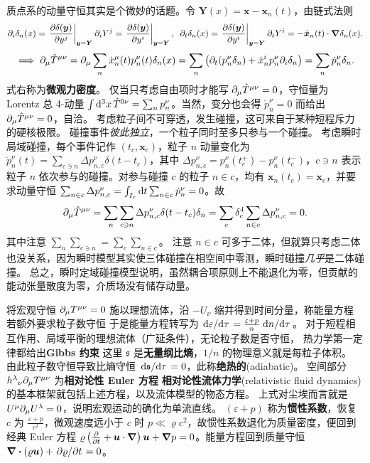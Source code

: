 质点系的动量守恒其实是个微妙的话题。令 $\bm Y(x) = \bm x-\bm x_n(t)$，由链式法则
\[
    \p_i\delta_n(x) = \eval{\pdv{\delta(\bm y)}{y^j}}_{\bm y = \bm Y} \p_i Y^j = \eval{\pdv{\delta(\bm y)}{y^i}}_{\bm y = \bm Y},\enskip\p_t\delta_n(x) = \eval{\pdv{\delta(\bm y)}{y^i}}_{\bm y = \bm Y} \p_t Y^i = -\dot{\bm x}_n(t)\cdot\grad\delta_n(x).
\]
\[\implies\partial_\mu \hat T^{\mu\nu} = \partial_\mu \sum_n \dot x^\mu_n(t) p^\nu_n(t) \delta_n(x)= \sum_n \left(\partial_t(p^\nu_n \delta_n) + \dot x^i_n p^\nu_n \partial_i\delta_n\right) = \sum_n \dot p^\nu_n \delta_n.\]
式右称为\textbf{微观力密度}。
仅当只考虑自由项时才能写 $\partial_\mu \hat T^{\mu\nu}=0$，守恒量为 Lorentz 总 4-动量 $\int\dd[3]{x} \hat T^{0\nu} = \sum_n p^\nu_n$。当然，变分也会得 $\dot p^\nu_n=0$ 而给出 $\partial_\mu \hat T^{\mu\nu}=0$，自洽。
考虑粒子间不可穿透，发生碰撞，这可来自于某种短程斥力的硬核极限。
碰撞事件\textit{彼此独立}，一个粒子同时至多只参与一个碰撞。
考虑瞬时局域碰撞，每个事件记作 $(t_c,\bm x_c)$，粒子 $n$ 动量变化为 $\dot p^\nu_n(t) = \sum_{c\ni n}\Delta p_{n,c}^\nu \delta(t-t_c)$，其中 $\Delta p_{n,c}^\nu=p_n^\nu(t_c^+) - p_n^\nu(t_c^-)$，$c\ni n$ 表示粒子 $n$ 依次参与的碰撞。对参与碰撞 $c$ 的粒子 $n\in c$，均有 $\bm x_n(t_c)=\bm x_c$，并要求动量守恒 $\sum_{n\in c} \Delta p_{n,c}^\nu = \int_{I_c}\dd t \sum_{n\in c}\dot p^\nu_n = 0$。故
\[
    \partial_\mu \hat T^{\mu\nu} = \sum_n\sum_{c\ni n} \Delta p_{n,c}^\nu \delta(t-t_c)\delta_n = \sum_c \delta^4_c\sum_{n\in c} \Delta p_{n,c}^\nu = 0.
\]
其中注意 $\sum_n\sum_{c\ni n}=\sum_c\sum_{n\in c}$。
注意 $n\in c$ 可多于二体，但就算只考虑二体也没关系，因为瞬时模型其实使三体碰撞在相空间中零测，瞬时碰撞\textit{几乎}是二体碰撞。
总之，瞬时定域碰撞模型说明，虽然耦合项原则上不能退化为零，但贡献的能动张量散度为零，介质场没有储存动量。

将宏观守恒 $\partial_\mu T^{\mu\nu} = 0$ 施以理想流体，沿 $-U_\nu$ 缩并得到时间分量，称能量方程
若额外要求粒子数守恒
于是能量方程转写为 $\dv*{\varepsilon}{\tau} = \frac{\varepsilon+p}{n}\dv*{n}{\tau}$。
对于短程相互作用、局域平衡的理想流体（广延条件），无论粒子数是否守恒，
热力学第一定律都给出\textbf{Gibbs 约束}
这里 $\mathfrak s$ 是\textbf{无量纲比熵}，$1/n$ 的物理意义就是每粒子体积。
由此粒子数守恒导致比熵守恒 $\dv*{\mathfrak s}{\tau}=0$，此称\textbf{绝热的}(adiabatic)。
空间部分 $h^{\lambda}{}_\nu \partial_\mu T^{\mu\nu}$ 为\textbf{相对论性 Euler 方程}
\textbf{相对论性流体力学}(relativistic fluid dynamics)的基本框架就包括上述方程，以及流体模型的物态方程。
上式对尘埃而言就是 $U^\mu\partial_\mu U^\lambda = 0$，说明宏观运动的确化为单流直线。
$(\varepsilon+p)$ 称为\textbf{惯性系数}，恢复 $c$ 为 $\frac{\varepsilon+p}{c^2}$，微观速度远小于 $c$ 时 $p \ll \varrho c^2$，故惯性系数退化为质量密度，便回到经典 Euler 方程 $\varrho\left(\pdv{t}+\bm u\cdot\grad\right)\bm u+\grad p=0$。能量方程回到质量守恒 $\div(\varrho\bm u)+ \pdv*{\varrho}{t} = 0$。


